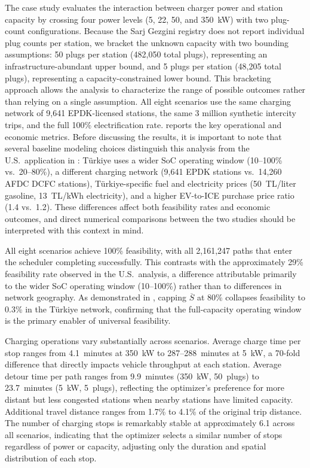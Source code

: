 The case study evaluates the interaction between charger power and station capacity by crossing four power levels (5, 22, 50, and 350~kW) with two plug-count configurations. Because the Sarj Gezgini registry does not report individual plug counts per station, we bracket the unknown capacity with two bounding assumptions: 50 plugs per station (482,050 total plugs), representing an infrastructure-abundant upper bound, and 5 plugs per station (48,205 total plugs), representing a capacity-constrained lower bound. This bracketing approach allows the analysis to characterize the range of possible outcomes rather than relying on a single assumption. All eight scenarios use the same charging network of 9,641 EPDK-licensed stations, the same 3 million synthetic intercity trips, and the full 100\% electrification rate.  reports the key operational and economic metrics. Before discussing the results, it is important to note that several baseline modeling choices distinguish this analysis from the U.S.\ application in \citet{cokyasar2026electrification}: T\"{u}rkiye uses a wider SoC operating window (10--100\% vs.\ 20--80\%), a different charging network (9,641 EPDK stations vs.\ 14,260 AFDC DCFC stations), T\"{u}rkiye-specific fuel and electricity prices (50~TL/liter gasoline, 13~TL/kWh electricity), and a higher EV-to-ICE purchase price ratio (1.4 vs.\ 1.2). These differences affect both feasibility rates and economic outcomes, and direct numerical comparisons between the two studies should be interpreted with this context in mind.

All eight scenarios achieve 100\% feasibility, with all 2,161,247 paths that enter the scheduler completing successfully. This contrasts with the approximately 29\% feasibility rate observed in the U.S.\ analysis, a difference attributable primarily to the wider SoC operating window (10--100\%) rather than to differences in network geography. As demonstrated in , capping $\overline{S}$ at 80\% collapses feasibility to 0.3\% in the T\"{u}rkiye network, confirming that the full-capacity operating window is the primary enabler of universal feasibility.

Charging operations vary substantially across scenarios. Average charge time per stop ranges from 4.1~minutes at 350~kW to 287--288~minutes at 5~kW, a 70-fold difference that directly impacts vehicle throughput at each station. Average detour time per path ranges from 9.9~minutes (350~kW, 50~plugs) to 23.7~minutes (5~kW, 5~plugs), reflecting the optimizer's preference for more distant but less congested stations when nearby stations have limited capacity. Additional travel distance ranges from 1.7\% to 4.1\% of the original trip distance. The number of charging stops is remarkably stable at approximately 6.1 across all scenarios, indicating that the optimizer selects a similar number of stops regardless of power or capacity, adjusting only the duration and spatial distribution of each stop.

